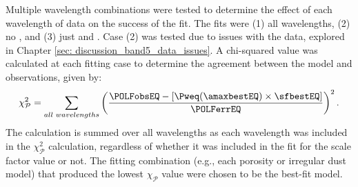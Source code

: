 %
%
%
%
%
Multiple wavelength combinations were tested to determine the effect of each wavelength of data on the success of the fit. The fits were (1) all wavelengths, (2) no \bfiveNS, and (3) just \bfour and \bsevenNS. Case (2) was tested due to issues with the \bfive data, explored in Chapter \ref{sec: discussion_band5_data_issues}.  A chi-squared value was calculated at each fitting case to determine the agreement between the model and observations, given by: 
\begin{equation}
\chi_\mathcal{P}^2 = \sum_{all\text{ }wavelengths} \left(\frac{\POLFobsEQ- [\Pweq (\amaxbestEQ) \times \sfbestEQ]}{\POLFerrEQ}\right)^2.
    \label{eq: chi_squared_dust_model}
\end{equation}
\noindent The calculation is summed over all wavelengths as each wavelength was included in the $\chi_\mathcal{P}^2$ calculation, regardless of whether it was included in the fit for the scale factor value or not. The fitting combination (e.g., each porosity or irregular dust model) that produced the lowest $\chi_\mathcal{P}$ value were chosen to be the best-fit model.







